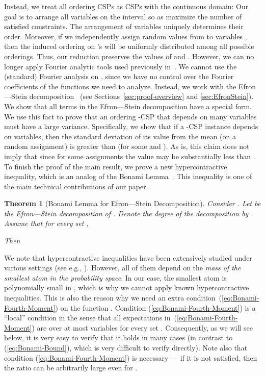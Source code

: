 \documentclass[11pt]{article}
\newtheorem{theorem}{Theorem}
\begin{document}
Instead, we treat all ordering CSPs as CSPs with the continuous domain: Our goal is to arrange
all variables on the interval  so as maximize the number of satisfied constraints.
The arrangement of variables uniquely  determines their order. Moreover, if we
independently assign random values from  to variables , then the induced ordering on 's will be
uniformly distributed among all  possible orderings.
Thus, our reduction preserves the values of  and . However, we can no longer
apply Fourier analytic tools used previously in~\cite{AGKSY, GZ, Mak}. We cannot use the
(standard) Fourier analysis on , since we have no control over the Fourier coefficients
of the functions we  need to analyze. Instead, we work with the Efron---Stein decomposition~\cite{ES}
(see Sections~\ref{sec:proof-overview} and \ref{sec:EfronStein}). We show that all terms in
the Efron---Stein decomposition have a special form. We use this fact to prove that an
ordering -CSP that depends on many variables must have a large variance.
Specifically, we show that
if a -CSP instance depends on  variables, then the standard deviation of its value from the mean
(on a random assignment) is greater than  (for some  and ). As is, this claim does not imply that
 since for some assignments the value may be substantially less than .
To finish the proof of the main result, we prove a new hypercontractive inequality, which is
an analog of the Bonami Lemma~\cite{Bonami}. This inequality is one of the main
technical contributions of our paper.

\begin{theorem}[Bonami Lemma for Efron---Stein Decomposition]\label{thm:bonami-for-ES}
Consider . Let  be the Efron---Stein decomposition of . Denote the degree of the decomposition by .
Assume that for every set ,

Then

\end{theorem}
We note that hypercontractive inequalities have been extensively studied under various settings
(see e.g., \cite{Talagrand94, DS96, Wolf07, MOS}). However, all of them depend on
the \textit{mass of the smallest atom in the probability space}. In our case, the smallest atom is polynomially small in ,
which is why we cannot apply known hypercontractive inequalities.
This is also the reason why we need an extra condition~(\ref{eq:Bonami-Fourth-Moment}) on the function .
Condition (\ref{eq:Bonami-Fourth-Moment}) is a ``local'' condition in
the sense that all expectations in~(\ref{eq:Bonami-Fourth-Moment}) are over at most  variables for every set .
Consequently, as we will see below, it is very easy to verify that it holds in many cases
(in contrast to (\ref{eq:Bonami-Bound}), which is very difficult to verify directly).
Note also that  condition (\ref{eq:Bonami-Fourth-Moment}) is necessary --- if it is not satisfied, then the ratio  can
be arbitrarily large even for .
\end{document}
